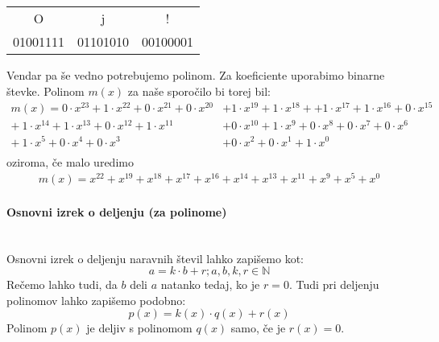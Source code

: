 \documentclass[12pt]{article}
\begin{document}
                \begin{table}[h!]
                    \centering
                    \begin{tabular}{ccc}
                    O        & j        & !        \\
                    01001111 & 01101010 & 00100001
                    \end{tabular}
                \end{table}

                Vendar pa še vedno potrebujemo polinom. Za koeficiente uporabimo
                binarne števke. Polinom $m(x)$ za naše sporočilo bi torej bil:
                \begin{equation}
                    \begin{split}
                        m(x) = 0 \cdot x^{23} + 1 \cdot x^{22} + 0 \cdot x^{21}
                        + 0 \cdot x^{20} & + 1 \cdot x^{19} + 1 \cdot x^{18} +
                        + 1 \cdot x^{17} + 1 \cdot x^{16} + 0 \cdot x^{15}\\
                        + \: 1 \cdot x^{14} + 1 \cdot x^{13} + 0 \cdot x^{12}
                        + 1 \cdot x^{11} & + 0  \cdot x^{10} + 1 \cdot x^{9}
                        + 0 \cdot x^{8} + 0 \cdot x^{7} + 0 \cdot x^{6} \\
                        + \:1 \cdot x^{5} + 0 \cdot x^{4} + 0 \cdot x^{3} &
                        + 0 \cdot x^{2} + 0 \cdot x^{1} + 1 \cdot x^{0}\\
                    \end{split}
                \end{equation}
                oziroma, če malo uredimo
                \begin{equation}
                    \begin{split}
                        m(x) = x^{22} + x^{19} + x^{18} + x^{17} + x^{16} +
                        x^{14} + x^{13} + x^{11} + x^{9} + x^{5} + x^{0}
                    \end{split}
                \end{equation}
            \paragraph{Osnovni izrek o deljenju (za polinome)} \mbox{}\\
                Osnovni izrek o deljenju naravnih števil lahko zapišemo kot:
                \begin{equation}
                    a = k \cdot b + r; a,b,k,r \in \mathbb{N}
                \end{equation}
                Rečemo lahko tudi, da $b$ deli $a$ natanko tedaj, ko je $r=0$.
                Tudi pri deljenju polinomov lahko zapišemo podobno:
                \begin{equation}
                    p(x) = k(x) \cdot q(x) + r(x)
                \end{equation}
                Polinom $p(x)$ je deljiv s polinomom $q(x)$ samo, če je 
                $r(x)=0$.
\end{document}
